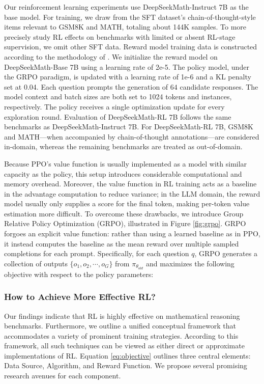 \begin{itemize}[topsep=0pt]
Our reinforcement learning experiments use DeepSeekMath-Instruct 7B as the base model. For training, we draw from the SFT dataset's chain-of-thought-style items relevant to GSM8K and MATH, totaling about 144K samples. To more precisely study RL effects on benchmarks with limited or absent RL-stage supervision, we omit other SFT data. Reward model training data is constructed according to the methodology of \citep{wang2023math}. We initialize the reward model on DeepSeekMath-Base 7B using a learning rate of 2e-5. The policy model, under the GRPO paradigm, is updated with a learning rate of 1e-6 and a KL penalty set at 0.04. Each question prompts the generation of $64$ candidate responses. The model context and batch sizes are both set to 1024 tokens and instances, respectively. The policy receives a single optimization update for every exploration round. Evaluation of DeepSeekMath-RL 7B follows the same benchmarks as DeepSeekMath-Instruct 7B. For DeepSeekMath-RL 7B, GSM8K and MATH—when accompanied by chain-of-thought annotations—are considered in-domain, whereas the remaining benchmarks are treated as out-of-domain.

Because PPO’s value function is usually implemented as a model with similar capacity as the policy, this setup introduces considerable computational and memory overhead. Moreover, the value function in RL training acts as a baseline in the advantage computation to reduce variance; in the LLM domain, the reward model usually only supplies a score for the final token, making per-token value estimation more difficult. To overcome these drawbacks, we introduce Group Relative Policy Optimization (GRPO), illustrated in Figure \ref{fig:grpo}. GRPO forgoes an explicit value function: rather than using a learned baseline as in PPO, it instead computes the baseline as the mean reward over multiple sampled completions for each prompt. Specifically, for each question $q$, GRPO generates a collection of outputs $\{o_1, o_2, \cdots, o_G\}$ from $\pi_{\theta_{old}}$ and maximizes the following objective with respect to the policy parameters:

\subsubsection{How to Achieve More Effective RL?}
\label{sec:effec_rl}
Our findings indicate that RL is highly effective on mathematical reasoning benchmarks. Furthermore, we outline a unified conceptual framework that accommodates a variety of prominent training strategies. According to this framework, all such techniques can be viewed as either direct or approximate implementations of RL. Equation \ref{eq:objective} outlines three central elements: Data Source, Algorithm, and Reward Function. We propose several promising research avenues for each component.


\end{itemize}
